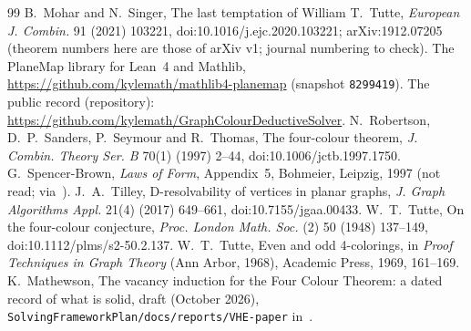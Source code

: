 \documentclass[11pt]{article}
\theoremstyle{definition}
\begin{document}
\begin{footnotesize}
\begin{thebibliography}{99}
 B.~Mohar and N.~Singer, The last temptation of William T.~Tutte, \emph{European J. Combin.} 91 (2021) 103221, doi:10.1016/j.ejc.2020.103221; arXiv:1912.07205 (theorem numbers here are those of arXiv v1; journal numbering to check).
 The PlaneMap library for Lean~4 and Mathlib, \url{https://github.com/kylemath/mathlib4-planemap} (snapshot \texttt{8299419}).
 The public record (repository): \url{https://github.com/kylemath/GraphColourDeductiveSolver}.
 N.~Robertson, D.~P.~Sanders, P.~Seymour and R.~Thomas, The four-colour theorem, \emph{J. Combin. Theory Ser. B} 70(1) (1997) 2--44, doi:10.1006/jctb.1997.1750.
 G.~Spencer-Brown, \emph{Laws of Form}, Appendix~5, Bohmeier, Leipzig, 1997 (not read; via~\cite{kauffman2005}).
 J.~A.~Tilley, D-resolvability of vertices in planar graphs, \emph{J. Graph Algorithms Appl.} 21(4) (2017) 649--661, doi:10.7155/jgaa.00433.
 W.~T.~Tutte, On the four-colour conjecture, \emph{Proc. London Math. Soc.} (2) 50 (1948) 137--149, doi:10.1112/plms/s2-50.2.137.
 W.~T.~Tutte, Even and odd 4-colorings, in \emph{Proof Techniques in Graph Theory} (Ann Arbor, 1968), Academic Press, 1969, 161--169.
 K.~Mathewson, The vacancy induction for the Four Colour Theorem: a dated record of what is solid, draft (October 2026), \texttt{SolvingFrameworkPlan/docs/reports/VHE-paper} in~\cite{record}.
\end{thebibliography}
\end{footnotesize}
\end{document}
